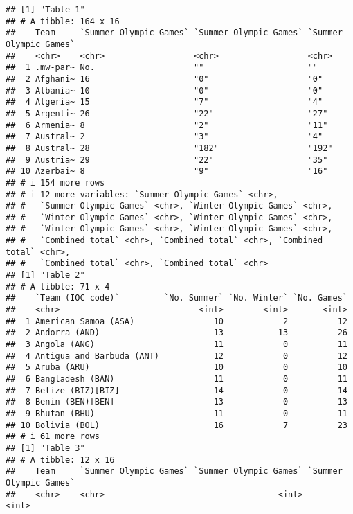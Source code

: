 \documentclass[
]{article}
\begin{document}
\begin{verbatim}
## [1] "Table 1"
## # A tibble: 164 x 16
##    Team     `Summer Olympic Games` `Summer Olympic Games` `Summer Olympic Games`
##    <chr>    <chr>                  <chr>                  <chr>                 
##  1 .mw-par~ No.                    ""                     ""                    
##  2 Afghani~ 16                     "0"                    "0"                   
##  3 Albania~ 10                     "0"                    "0"                   
##  4 Algeria~ 15                     "7"                    "4"                   
##  5 Argenti~ 26                     "22"                   "27"                  
##  6 Armenia~ 8                      "2"                    "11"                  
##  7 Austral~ 2                      "3"                    "4"                   
##  8 Austral~ 28                     "182"                  "192"                 
##  9 Austria~ 29                     "22"                   "35"                  
## 10 Azerbai~ 8                      "9"                    "16"                  
## # i 154 more rows
## # i 12 more variables: `Summer Olympic Games` <chr>,
## #   `Summer Olympic Games` <chr>, `Winter Olympic Games` <chr>,
## #   `Winter Olympic Games` <chr>, `Winter Olympic Games` <chr>,
## #   `Winter Olympic Games` <chr>, `Winter Olympic Games` <chr>,
## #   `Combined total` <chr>, `Combined total` <chr>, `Combined total` <chr>,
## #   `Combined total` <chr>, `Combined total` <chr>
## [1] "Table 2"
## # A tibble: 71 x 4
##    `Team (IOC code)`         `No. Summer` `No. Winter` `No. Games`
##    <chr>                            <int>        <int>       <int>
##  1 American Samoa (ASA)                10            2          12
##  2 Andorra (AND)                       13           13          26
##  3 Angola (ANG)                        11            0          11
##  4 Antigua and Barbuda (ANT)           12            0          12
##  5 Aruba (ARU)                         10            0          10
##  6 Bangladesh (BAN)                    11            0          11
##  7 Belize (BIZ)[BIZ]                   14            0          14
##  8 Benin (BEN)[BEN]                    13            0          13
##  9 Bhutan (BHU)                        11            0          11
## 10 Bolivia (BOL)                       16            7          23
## # i 61 more rows
## [1] "Table 3"
## # A tibble: 12 x 16
##    Team     `Summer Olympic Games` `Summer Olympic Games` `Summer Olympic Games`
##    <chr>    <chr>                                   <int>                  <int>

\end{verbatim}
\end{document}
